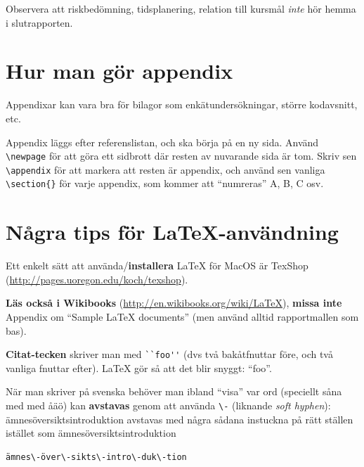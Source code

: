 \documentclass[swedish, a4paper,12pt]{article}
\begin{document}
Observera att risk\-be\-döm\-ning, tids\-planering, relation till kursmål \emph{inte} hör hemma i slutrapporten.
\fi
\newpage

%



\newpage
\appendix %
\iffalse \section{Hur man gör appendix}
Appendixar kan vara bra för bilagor som enkätundersökningar, större kodavsnitt, etc.

Appendix läggs efter referenslistan, och ska börja på en ny sida. Använd \verb|\newpage| för att göra ett sidbrott där resten av nuvarande sida är tom. Skriv sen \verb|\appendix| för att markera att resten är appendix, och
 använd sen vanliga \verb|\section{}| för varje appendix, som kommer att ``numreras'' A, B, C osv.

\section{Några tips för La\TeX-användning}

Ett enkelt sätt att använda/\textbf{installera} LaTeX för MacOS är TexShop (\url{http://pages.uoregon.edu/koch/texshop}).

\textbf{Läs också i Wikibooks} (\url{http://en.wikibooks.org/wiki/LaTeX}), \textbf{missa inte} Appendix om ``Sample LaTeX documents'' (men använd alltid rapportmallen som bas).

\textbf{Citat-tecken} skriver man med \verb|``foo''| (dvs två bakåtfnuttar före, och två vanliga fnuttar efter). LaTeX gör så att det blir snyggt: ``foo''.

När man skriver på svenska behöver man ibland ``visa'' var ord (speciellt såna med med åäö) kan \textbf{avstavas} genom att använda \verb|\-| (liknande \textit{soft hyphen}): ämnesöversiktsintroduktion avstavas med några sådana instuckna på rätt ställen istället som ämnes\-över\-sikts\-intro\-duk\-tion

\begin{verbatim}
ämnes\-över\-sikts\-intro\-duk\-tion
\end{verbatim}
\end{document}
